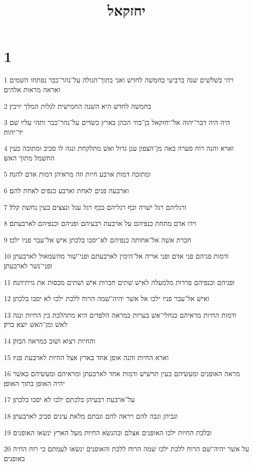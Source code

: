 

\title{יחזקאל}


\chapter{1}

\par 1 ויהי בשׁלשׁים שׁנה ברביעי בחמשׁה לחדשׁ ואני בתוך־הגולה על־נהר־כבר נפתחו השׁמים ואראה מראות אלהים׃
\par 2 בחמשׁה לחדשׁ היא השׁנה החמישׁית לגלות המלך יויכין׃
\par 3 היה היה דבר־יהוה אל־יחזקאל בן־בוזי הכהן בארץ כשׂדים על־נהר־כבר ותהי עליו שׁם יד־יהוה׃
\par 4 וארא והנה רוח סערה באה מן־הצפון ענן גדול ואשׁ מתלקחת ונגה לו סביב ומתוכה כעין החשׁמל מתוך האשׁ׃
\par 5 ומתוכה דמות ארבע חיות וזה מראיהן דמות אדם להנה׃
\par 6 וארבעה פנים לאחת וארבע כנפים לאחת להם׃
\par 7 ורגליהם רגל ישׁרה וכף רגליהם ככף רגל עגל ונצצים כעין נחשׁת קלל׃
\par 8 וידו אדם מתחת כנפיהם על ארבעת רבעיהם ופניהם וכנפיהם לארבעתם׃
\par 9 חברת אשׁה אל־אחותה כנפיהם לא־יסבו בלכתן אישׁ אל־עבר פניו ילכו׃
\par 10 ודמות פניהם פני אדם ופני אריה אל־הימין לארבעתם ופני־שׁור מהשׂמאול לארבעתן ופני־נשׁר לארבעתן׃
\par 11 ופניהם וכנפיהם פרדות מלמעלה לאישׁ שׁתים חברות אישׁ ושׁתים מכסות את גויתיהנה׃
\par 12 ואישׁ אל־עבר פניו ילכו אל אשׁר יהיה־שׁמה הרוח ללכת ילכו לא יסבו בלכתן׃
\par 13 ודמות החיות מראיהם כגחלי־אשׁ בערות כמראה הלפדים היא מתהלכת בין החיות ונגה לאשׁ ומן־האשׁ יוצא ברק׃
\par 14 והחיות רצוא ושׁוב כמראה הבזק׃
\par 15 וארא החיות והנה אופן אחד בארץ אצל החיות לארבעת פניו׃
\par 16 מראה האופנים ומעשׂיהם כעין תרשׁישׁ ודמות אחד לארבעתן ומראיהם ומעשׂיהם כאשׁר יהיה האופן בתוך האופן׃
\par 17 על־ארבעת רבעיהן בלכתם ילכו לא יסבו בלכתן׃
\par 18 וגביהן וגבה להם ויראה להם וגבתם מלאת עינים סביב לארבעתן׃
\par 19 ובלכת החיות ילכו האופנים אצלם ובהנשׂא החיות מעל הארץ ינשׂאו האופנים׃
\par 20 על אשׁר יהיה־שׁם הרוח ללכת ילכו שׁמה הרוח ללכת והאופנים ינשׂאו לעמתם כי רוח החיה באופנים׃
